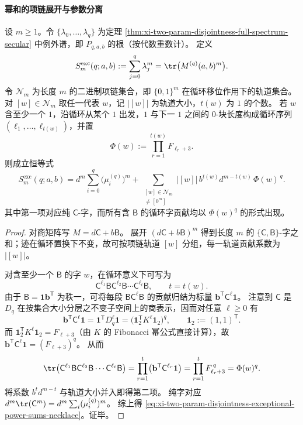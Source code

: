 \paragraph{幂和的项链展开与参数分离}
\begin{theorem}\label{thm:xi-two-param-disjointness-exceptional-power-sums-necklace}
设 \(m\ge 1\)。令 \(\{\lambda_0,\dots,\lambda_q\}\) 为定理 \ref{thm:xi-two-param-disjointness-full-spectrum-secular} 中例外谱，即 \(P_{q,a,b}\) 的根（按代数重数计）。
定义
\[
S^{\mathrm{exc}}_{m}(q;a,b):=\sum_{j=0}^q \lambda_j^m=\tr\bigl(M^{(q)}(a,b)^m\bigr).
\]
令 \(\mathcal N_m\) 为长度 \(m\) 的二进制项链集合，即 \(\{0,1\}^m\) 在循环移位作用下的轨道集合。
对 \([w]\in\mathcal N_m\) 取任一代表 \(w\)，记 \(|[w]|\) 为轨道大小，\(t(w)\) 为 \(1\) 的个数。
若 \(w\) 含至少一个 \(1\)，沿循环从某个 \(1\) 出发，\(1\) 与下一 \(1\) 之间的 \(0\)-块长度构成循环序列 \((\ell_1,\dots,\ell_{t(w)})\)，并置
\[
\Phi(w):=\prod_{r=1}^{t(w)} F_{\ell_r+3}.
\]
则成立恒等式
\begin{equation}\label{eq:xi-two-param-disjointness-exceptional-power-sums-necklace}
S^{\mathrm{exc}}_{m}(q;a,b)=
d^m\sum_{i=0}^q \bigl(\mu_i^{(q)}\bigr)^m
+\sum_{\substack{[w]\in\mathcal N_m\\ [w]\ne [0^m]}}
|[w]|\, b^{t(w)}d^{m-t(w)}\,\Phi(w)^{\,q}.
\end{equation}
其中第一项对应纯 \(\mathsf C\)-字，而所有含 \(\mathsf B\) 的循环字贡献均以 \(\Phi(w)^q\) 的形式出现。
\end{theorem}
\begin{proof}
对商矩阵写 \(M=d\mathsf C+b\mathsf B\)。
展开 \((d\mathsf C+b\mathsf B)^m\) 得到长度 \(m\) 的 \(\{\mathsf C,\mathsf B\}\)-字之和；迹在循环置换下不变，故可按项链轨道 \([w]\) 分组，每一轨道贡献系数为 \(|[w]|\)。
\par
对含至少一个 \(\mathsf B\) 的字 \(w\)，在循环意义下可写为
\[
\mathsf C^{\ell_1}\mathsf B\mathsf C^{\ell_2}\mathsf B\cdots \mathsf C^{\ell_t}\mathsf B,
\qquad t=t(w).
\]
由于 \(\mathsf B=\mathbf 1\mathbf b^{\mathsf T}\) 为秩一，可将每段 \(\mathsf B\mathsf C^{\ell}\mathsf B\) 的贡献归结为标量 \(\mathbf b^{\mathsf T}\mathsf C^{\ell}\mathbf 1\)。
注意到 \(\mathsf C\) 是 \(D_q\) 在按集合大小分层之不变子空间上的商表示，因而对任意 \(\ell\ge 0\) 有
\[
\mathbf b^{\mathsf T}\mathsf C^{\ell}\mathbf 1
=\mathbf 1^{\mathsf T}D_q^{\ell}\mathbf 1
=\bigl(\mathbf 1_2^{\mathsf T}K^{\ell}\mathbf 1_2\bigr)^q,
\qquad
\mathbf 1_2:=(1,1)^{\mathsf T}.
\]
而 \(\mathbf 1_2^{\mathsf T}K^{\ell}\mathbf 1_2=F_{\ell+3}\)（由 \(K\) 的 Fibonacci 幂公式直接计算），故 \(\mathbf b^{\mathsf T}\mathsf C^{\ell}\mathbf 1=(F_{\ell+3})^q\)。
从而
\[
\tr\bigl(\mathsf C^{\ell_1}\mathsf B\mathsf C^{\ell_2}\mathsf B\cdots \mathsf C^{\ell_t}\mathsf B\bigr)
=\prod_{r=1}^{t}\bigl(\mathbf b^{\mathsf T}\mathsf C^{\ell_r}\mathbf 1\bigr)
=\prod_{r=1}^{t}F_{\ell_r+3}^{\,q}
=\Phi(w)^q.
\]
将系数 \(b^t d^{m-t}\) 与轨道大小并入即得第二项。
纯字对应 \(d^m\tr(\mathsf C^m)=d^m\sum_i(\mu_i^{(q)})^m\)。
综上得 \eqref{eq:xi-two-param-disjointness-exceptional-power-sums-necklace}。证毕。
\end{proof}


